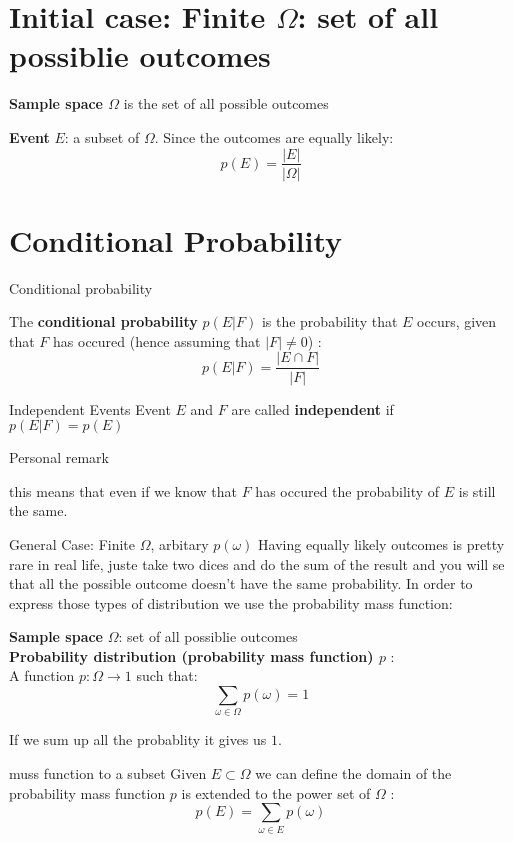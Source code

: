 \section{Initial case: Finite $\Omega$: set of all possiblie outcomes}
\begin{definition}
\textbf{Sample space $\Omega$} is the set of all possible outcomes
\end{definition}
\begin{definition}
    \textbf{Event} $E$: a subset of $\Omega$. Since the outcomes are equally likely: 
    \[p(E) = \frac{|E|}{|\Omega|}\]
\end{definition}
\section{Conditional Probability}
\begin{parag}{Conditional probability}
    \begin{definition}
        The \textbf{conditional probability} $p(E|F)$ is the probability that $E$ occurs, given that $F$ has occured (hence assuming that $|F| \neq 0$) : 
        \[p(E|F) = \frac{|E \cap F|}{|F|}\]
    \end{definition}
\end{parag}
\begin{parag}{Independent Events}
    Event $E$ and $F$ are called \textbf{independent} if $p(E|F) = p(E)$
    \begin{subparag}{Personal remark}
        \begin{framedremark}
            this means that even if we know that $F$ has occured the probability of $E$ is still the same.
        \end{framedremark}
    \end{subparag}
\end{parag}
\begin{parag}{General Case: Finite $\Omega$, arbitary $p(\omega)$}
    Having equally likely outcomes is pretty rare in real life, juste take two dices and do the sum of the result and you will se that all the possible outcome doesn't have the same probability. In order to express those types of distribution we use the probability mass function:
    \begin{definition}
        \textbf{Sample space} $\Omega$: set of all possiblie outcomes
        \\
        \textbf{Probability distribution (probability mass function) $p$} : 
        \\
        A function $p : \Omega \to 1$ such that: 
        \[\sum_{\omega \in \Omega} p(\omega) = 1\]
    \end{definition}
    If we sum up all the probablity it gives us $1$.
     \begin{subparag}{muss function to a subset}
         Given $E \subset \Omega$ we can define the domain of the probability mass function $p$ is extended to the power set of $\Omega$ : 
         \[p(E) = \sum_{\omega \in E} p(\omega)\]
     \end{subparag}
\end{parag}
